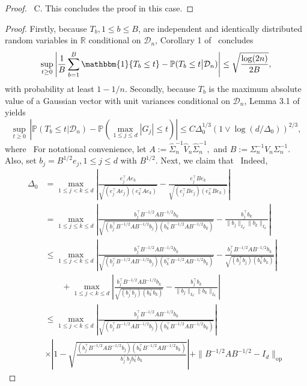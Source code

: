 \documentclass{article}
\begin{document}
\begin{appendices}
\begin{proof}
\ \le C.
\]
This concludes the proof in this case.
\end{proof}
\begin{proof}
Firstly, because $T_b, 1\le b\le B$, are independent and identically distributed random variables in $\mathbb{R}$ conditional on $\mathcal{D}_n$, Corollary 1 of~\cite{massart1990tight} concludes
\begin{equation}\label{eq:Average-to-conditional-probability}
\sup_{t\ge 0}\left|\frac{1}{B}\sum_{b=1}^B\mathbbm{1}\{T_b \le t\} - \mathbb{P}(T_b \le t\big|\mathcal{D}_n)\right| \le \sqrt{\frac{\log(2n)}{2B}},
\end{equation}
with probability at least $1 - 1/n$.
Secondly, because $T_b$ is the maximum absolute value of a Gaussian vector with unit variances conditional on $\mathcal{D}_n$, Lemma 3.1 of~\cite{Cher13} yields
\begin{equation}\label{eq:Gaussian-comparison-bound}
\sup_{t\ge 0}\,\left|\mathbb{P}(T_b \le t\big|\mathcal{D}_n) - \mathbb{P}\left(\max_{1\le j\le d}|G_j| \le t\right)\right| \le C\Delta_0^{1/3}(1\vee \log(d/\Delta_0))^{2/3},
\end{equation}
where
\ For notational convenience, let
$A := \widehat{\Sigma}_n^{-1}\widehat{V}_n\widehat{\Sigma}_n^{-1},$ and $B := \Sigma_n^{-1}V_n\Sigma_n^{-1}.$
Also, set $b_j = B^{1/2}e_j, 1\le j\le d$ with $B^{1/2}$.
Next, we claim that
\ Indeed,
\begin{align*}
\Delta_0
&= \max_{1\le j < k\le d}\left|\frac{e_j^{\top}Ae_k}{\sqrt{(e_j^{\top}Ae_j)(e_k^{\top}Ae_k)}} - \frac{e_j^{\top}Be_k}{\sqrt{(e_j^{\top}Be_j)(e_k^{\top}Be_k)}}\right|\\ &= \max_{1\le j\le k \le d}\left|\frac{b_j^{\top}B^{-1/2}AB^{-1/2}b_k}{\sqrt{(b_j^{\top}B^{-1/2}AB^{-1/2}b_j)(b_k^{\top}B^{-1/2}AB^{-1/2}b_k)}} - \frac{b_j^{\top}b_k}{\|b_j\|_{I_d}\|b_k\|_{I_d}}\right|\\ &\le \max_{1\le j < k\le d}\left|\frac{b_j^{\top}B^{-1/2}AB^{-1/2}b_k}{\sqrt{(b_j^{\top}B^{-1/2}AB^{-1/2}b_j)(b_k^{\top}B^{-1/2}AB^{-1/2}b_k)}} - \frac{b_j^{\top}B^{-1/2}AB^{-1/2}b_k}{\sqrt{(b_j^{\top}b_j)(b_k^{\top}b_k)}}\right|\\ &\qquad+ \max_{1\le j < k\le d}\left|\frac{b_j^{\top}B^{-1/2}AB^{-1/2}b_k}{\sqrt{(b_j^{\top}b_j)(b_k^{\top}b_k)}} - \frac{b_j^{\top}b_k}{\|b_j\|_{I_d}\|b_k\|_{I_d}}\right|\\ &\le \max_{1\le j < k\le d}\left|\frac{b_j^{\top}B^{-1/2}AB^{-1/2}b_k}{\sqrt{(b_j^{\top}B^{-1/2}AB^{-1/2}b_j)(b_k^{\top}B^{-1/2}AB^{-1/2}b_k)}}\right|\\ & \times\left|1 - \sqrt{\frac{(b_j^{\top}B^{-1/2}AB^{-1/2}b_j)(b_k^{\top}B^{-1/2}AB^{-1/2}b_k)}{b_j^{\top}b_jb_k^{\top}b_k}}\right|+ \|B^{-1/2}AB^{-1/2} - I_d\|_{\mathrm{op}}

\end{align*}
\end{proof}
\end{appendices}
\end{document}
